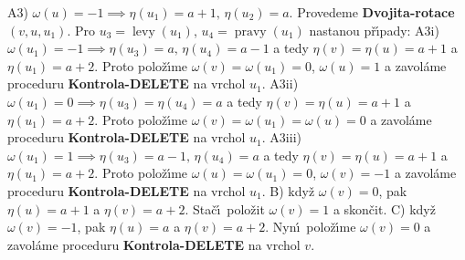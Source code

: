 \documentclass[a4paper,12pt]{article}
\DeclareMathOperator*{\levy}{levy}
\DeclareMathOperator*{\pravy}{pravy}
\begin{document}
\flushpar A3) $\omega (u)=-1\implies\eta (u_1)=a+1,\,\eta (u_2)=a$.  Provedeme 
{\bf Dvojita-rotace$(v,u,u_1)$}.  Pro $u_3=\levy(u_1)$, 
$u_4=\pravy(u_1)$ nastanou p\v r\'\i pady:\newline 
A3i) $\omega (u_1)=-1\implies\eta (u_3)=a,\,\eta (u_4)=a-1$ a tedy 
$\eta (v)=\eta (u)=a+1$ a $\eta (u_1)=a+2$. Proto polo\v z\'\i me 
$\omega (v)=\omega (u_1)=0$, $\omega (u)=1$ a zavol\'ame proceduru {\bf Kontrola-DELETE }
na vrchol $u_1$.\newline 
A3ii) $\omega (u_1)=0\implies\eta (u_3)=\eta (u_4)=a$ a tedy 
$\eta (v)=\eta (u)=a+1$ a $\eta (u_1)=a+2$. Proto polo\v z\'\i me 
$\omega (v)=\omega (u_1)=\omega (u)=0$ a zavol\'ame proceduru {\bf Kontrola-DELETE }
na vrchol $u_1$.\newline 
A3iii) $\omega (u_1)=1\implies\eta (u_3)=a-1,\,\eta (u_4)=a$ a tedy 
$\eta (v)=\eta (u)=a+1$ a $\eta (u_1)=a+2$. Proto polo\v z\'\i me 
$\omega (u)=\omega (u_1)=0$, $\omega (v)=-1$ a zavol\'ame proceduru {\bf Kontrola-DELETE }
na vrchol $u_1$.\newline 
B) kdy\v z $\omega (v)=0$, pak $\eta (u)=a+1$ a $\eta (v)=a+2$. 
Sta\v c\'\i\ polo\v zit $\omega (v)=1$ a skon\v cit.\newline 
C) kdy\v z $\omega (v)=-1$, pak $\eta (u)=a$ a $\eta (v)=a+2$. 
Nyn\'\i\ polo\v z\'\i me $\omega (v)=0$ a 
zavol\'ame proceduru {\bf Kontrola-DELETE} na vrchol $v$.
\medskip
\end{document}
